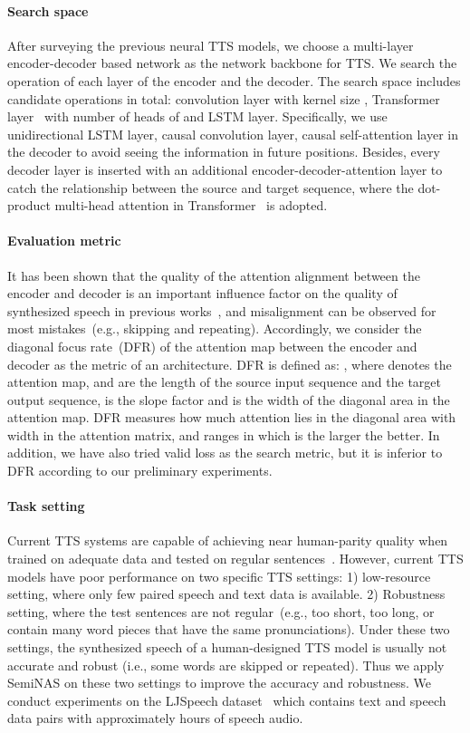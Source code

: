 \documentclass{article}
\begin{document}
\paragraph{Search space} After surveying the previous neural TTS models, we choose a multi-layer encoder-decoder based network as the network backbone for TTS. We search the operation of each layer of the encoder and the decoder. The search space includes  candidate operations in total: convolution layer with kernel size , Transformer layer~\cite{transformertts} with number of heads of  and LSTM layer. Specifically, we use unidirectional LSTM layer, causal convolution layer, causal self-attention layer in the decoder to avoid seeing the information in future positions. Besides, every decoder layer is inserted with an additional encoder-decoder-attention layer to catch the relationship between the source and target sequence, where the dot-product multi-head attention in Transformer~\cite{transformer} is adopted.

\paragraph{Evaluation metric} It has been shown that the quality of the attention alignment between the encoder and decoder is an important influence factor on the quality of synthesized speech in previous works~\cite{fastspeech,tacotron,tacotron2,transformertts,deepvoice3}, and misalignment can be observed for most mistakes~(e.g., skipping and repeating). Accordingly, we consider the diagonal focus rate~(DFR) of the attention map between the encoder and decoder as the metric of an architecture. DFR is defined as: , where  denotes the attention map,  and  are the length of the source input sequence and the target output sequence,  is the slope factor and  is the width of the diagonal area in the attention map. DFR measures how much attention lies in the diagonal area with width  in the attention matrix, and ranges in  which is the larger the better. In addition, we have also tried valid loss as the search metric, but it is inferior to DFR according to our preliminary experiments.

\paragraph{Task setting} Current TTS systems are capable of achieving near human-parity quality when trained on adequate data and tested on regular sentences~\cite{tacotron2,transformertts}. However, current TTS models have poor performance on two specific TTS settings: 1) low-resource setting, where only few paired speech and text data is available. 2) Robustness setting, where the test sentences are not regular~(e.g., too short, too long, or contain many word pieces that have the same pronunciations). Under these two settings, the synthesized speech of a human-designed TTS model is usually not accurate and robust (i.e., some words are skipped or repeated). Thus we apply SemiNAS on these two settings to improve the accuracy and robustness. We conduct experiments on the LJSpeech dataset~\cite{ljspeech} which contains  text and speech data pairs with approximately  hours of speech audio.
\end{document}
